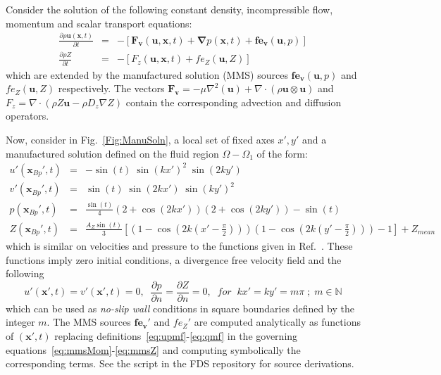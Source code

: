 \documentclass[11pt]{book}
\begin{document}
Consider the solution of the following constant density, incompressible flow, momentum and scalar transport equations:
\begin{eqnarray}
  \frac{\partial \rho \mathbf{u}(\mathbf{x},t)}{\partial t} &=& -\left[ \mathbf{F_v}(\mathbf{u},\mathbf{x},t) + \boldsymbol{\nabla} p(\mathbf{x},t) + \mathbf{fe_v}(\mathbf{u},p) \right] \label{eq:mmsMom} \\
  \frac{\partial \rho Z}{\partial t} &=& -\left[  F_z(\mathbf{u},\mathbf{x},t) +  fe_Z(\mathbf{u},Z)   \right]
  \label{eq:mmsZ}
\end{eqnarray}
which are extended by the manufactured solution (MMS) sources $\mathbf{fe_v}(\mathbf{u},p)$ and $fe_Z(\mathbf{u},Z)$ respectively. The vectors $\mathbf{F_v}=-\mu \nabla^2(\mathbf{u}) + \nabla \cdot \left( \rho \mathbf{u} \otimes \mathbf{u} \right)$ and $F_z= \nabla \cdot \left( \rho Z \mathbf{u} - \rho D_z \nabla Z \right) $ contain the corresponding advection and diffusion operators.

Now, consider in Fig.~\ref{Fig:ManuSoln}, a local set of fixed axes $x',y'$ and a manufactured solution defined on the fluid region $\Omega - \Omega_1$ of the form:
\begin{eqnarray}
   u'(\mathbf{x}_{Bp}',t) &=& -\sin(t) \; \sin(kx')^2 \; \sin(2ky') \label{eq:upmf} \\
   v'(\mathbf{x}_{Bp}',t) &=&   \sin(t) \; \sin(2kx') \; \sin(ky')^2 \label{eq:vpmf} \\
   p(\mathbf{x}_{Bp}',t) &=& \frac{\sin(t)}{4} \left( 2+\cos(2kx') \right) \left( 2+\cos(2ky') \right) - \sin(t) \label{eq:pmf} \\
   Z(\mathbf{x}_{Bp}',t) &=& \frac{A_Z \sin(t)}{3} \left[ \left( 1-\cos(2k(x'-\frac{\pi}{2})) \right)
                                       \left( 1-\cos(2k(y'-\frac{\pi}{2})) \right) - 1 \right] + Z_{mean} \label{eq:qmf}
\end{eqnarray}
which is similar on velocities and pressure to the functions given in Ref.~\cite{E:CMS2003}.  These functions imply zero initial conditions, a divergence free velocity field and the following
\begin{equation}
   u'(\mathbf{x}',t)=v'(\mathbf{x}',t)=0, \; \; \frac{\partial p}{\partial n} = \frac{\partial Z}{\partial n}=0, \; \;
   for \; \; kx'=ky'= m \pi \; ; \; m \in \mathbb{N}
\end{equation}
which can be used as \textit{no-slip wall} conditions in square boundaries defined by the integer $m$. The MMS sources $\mathbf{fe_v'}$ and $fe_Z'$ are computed analytically as functions of $(\mathbf{x'},t)$ replacing definitions~\eqref{eq:upmf}-\eqref{eq:qmf} in the governing equations~\eqref{eq:mmsMom}-\eqref{eq:mmsZ} and computing symbolically the corresponding terms. See the script  in the FDS repository for source derivations.
\end{document}
